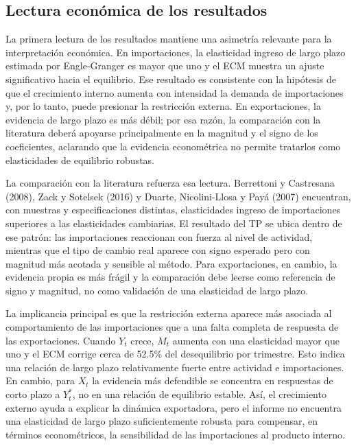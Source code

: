 \documentclass[11pt,a4paper]{article}
\begin{document}
	\subsection{Lectura económica de los resultados}
	\label{subsec:comparacion-lectura-economica}
	
	La primera lectura de los resultados mantiene una asimetría relevante para la
	interpretación económica. En importaciones, la elasticidad ingreso de largo
	plazo estimada por Engle-Granger es mayor que uno y el ECM muestra un ajuste
	significativo hacia el equilibrio. Ese resultado es consistente con la hipótesis
	de que el crecimiento interno aumenta con intensidad la demanda de importaciones
	y, por lo tanto, puede presionar la restricción externa. En exportaciones, la
	evidencia de largo plazo es más débil; por esa razón, la comparación con la
	literatura deberá apoyarse principalmente en la magnitud y el signo de los
	coeficientes, aclarando que la evidencia econométrica no permite tratarlos como
	elasticidades de equilibrio robustas.
	
	La comparación con la literatura refuerza esa lectura. Berrettoni y Castresana
	(2008), Zack y Sotelsek (2016) y Duarte, Nicolini-Llosa y Payá (2007)
	encuentran, con muestras y especificaciones distintas, elasticidades ingreso de
	importaciones superiores a las elasticidades cambiarias. El resultado del TP se
	ubica dentro de ese patrón: las importaciones reaccionan con fuerza al nivel de
	actividad, mientras que el tipo de cambio real aparece con signo esperado pero
	con magnitud más acotada y sensible al método. Para exportaciones, en cambio,
	la evidencia propia es más frágil y la comparación debe leerse como referencia
	de signo y magnitud, no como validación de una elasticidad de largo plazo.
	
	La implicancia principal es que la restricción externa aparece más asociada al
	comportamiento de las importaciones que a una falta completa de respuesta de las
	exportaciones. Cuando \(Y_t\) crece, \(M_t\) aumenta con una elasticidad mayor
	que uno y el ECM corrige cerca de 52.5\% del desequilibrio por trimestre. Esto
	indica una relación de largo plazo relativamente fuerte entre actividad e
	importaciones. En cambio, para \(X_t\) la evidencia más defendible se concentra
	en respuestas de corto plazo a \(Y_t^*\), no en una relación de equilibrio
	estable. Así, el crecimiento externo ayuda a explicar la dinámica exportadora,
	pero el informe no encuentra una elasticidad de largo plazo suficientemente
	robusta para compensar, en términos econométricos, la sensibilidad de las
	importaciones al producto interno.
	
\end{document}
